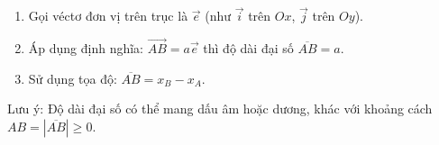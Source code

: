 \begin{enumerate}
\item Gọi véctơ đơn vị trên trục là $\overrightarrow{e}$ (như $\overrightarrow{i}$ trên $Ox$, $\overrightarrow{j}$ trên $Oy$).
\item Áp dụng định nghĩa: $\overrightarrow{AB} = a\overrightarrow{e}$ thì độ dài đại số $\overline{AB} = a$.
\item Sử dụng tọa độ: $\overline{AB} = x_B - x_A$.
\end{enumerate}
Lưu ý: Độ dài đại số có thể mang dấu âm hoặc dương, khác với khoảng cách $AB = |\overline{AB}| \ge 0$.
